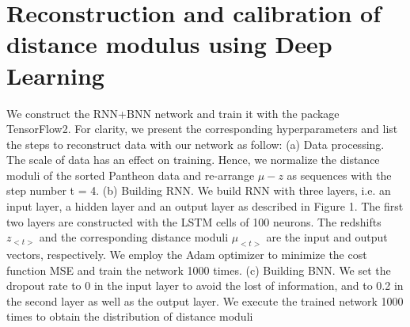 \section{Reconstruction and calibration of distance modulus using Deep Learning}
\label{results_lstm_pantheon}
We construct the RNN+BNN network and train it with the package TensorFlow2\cite{tensorflow2015-whitepaper}. For clarity, we present the corresponding hyperparameters  and list the steps to reconstruct data with our network as follow: (a) Data processing. The scale of data has an effect on training. Hence, we normalize the distance moduli of the sorted Pantheon data and re-arrange $\mu-z$ as sequences with the step number t = 4. (b) Building RNN. We build RNN with three layers, i.e. an input layer, a hidden layer and an output layer as described in Figure 1. The first two layers are constructed with the LSTM cells of 100 neurons. The redshifts $z_{<t>}$ and the corresponding distance moduli $\mu_{<t>}$ are the input and output vectors, respectively. We employ the Adam optimizer to minimize the cost function MSE and train the network 1000 times. (c) Building BNN. We set the dropout rate to 0 in the input layer to avoid the lost of information, and to 0.2 in the second layer as well as the output layer. We execute the trained network 1000 times to obtain the distribution of distance moduli



